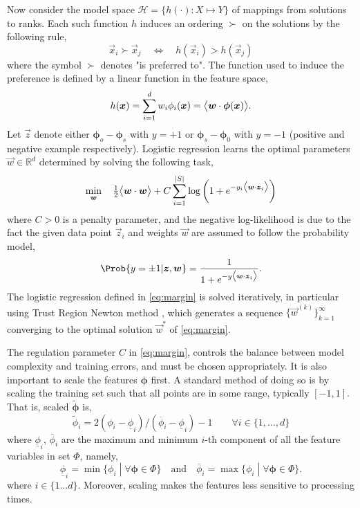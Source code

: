 \documentclass[smallextended]{svjour3}
\renewcommand{\vphi}{\bm \phi}
\begin{document}
	Now consider the model space $\mathcal{H} = \{h(\cdot) : X \mapsto Y\}$ of mappings from solutions to ranks. Each such function $h$ induces an ordering $\succ$ on the solutions  by the following rule,
	\begin{equation}\label{eq:linear}
	\vec{x}_i \succ \vec{x}_j \quad \Leftrightarrow \quad h(\vec{x}_i) > h(\vec{x}_j)
	\end{equation}
	where the symbol $\succ$ denotes "is preferred to".  The function used to induce the preference is defined by a linear function in the feature space,
	\begin{equation}\label{eq:jssp:linweights}
	h(\vec{x})=\sum_{i=1}^d w_i\phi_i(\vec{x})=\inner{\vec{w}}{\vphi(\vec{x})}.
	\end{equation}
	Let $\vec{z}$ denote either $\vphi_o-\vphi_s$ with $y=+1$ or $\vphi_s-\vphi_0$ with $y=-1$ (positive and negative example respectively). Logistic regression learns the optimal parameters $\vec{w}\in\mathbb{R}^d$ determined by solving the following task, 
	\begin{equation}\label{eq:margin}
	\min_{\vec{w}}\quad \tfrac{1}{2}\inner{\vec{w}}{\vec{w}} + C \sum_{i=1}^{\abs{S}} \log\left(1 + e^{-y_i \inner{\vec{w}}{\vec{z}_i}}\right) 
	\end{equation}
	where $C > 0$ is a penalty parameter, and the negative log-likelihood is due to the fact the given data point $\vec{z}_i$ and weights $\vec{w}$ are assumed to follow the probability model,
	\begin{equation}\label{eq:prob}
	\Prob{y=\pm1|\vec{z},\vec{w}}=\frac{1}{1+e^{-y\inner{\vec{w}}{\vec{z}_i}}}.
	\end{equation}
	The logistic regression defined in \eqref{eq:margin} is solved iteratively, in particular using Trust Region Newton method \cite{Lin08:newtontrustregion}, which generates a sequence $\{\vec{w}^{(k)}\}_{k=1}^\infty$ converging to the optimal solution $\vec{w}^*$ of \eqref{eq:margin}.
	
	The regulation parameter $C$ in \eqref{eq:margin}, controls the balance between model complexity and training errors, and must be chosen appropriately. It is also important to scale the features $\vphi$ first. A standard method of doing so is by scaling the training set such that all points are in some range, typically $[-1,1]$. That is, scaled $\tilde{\vphi}$ is,
	\begin{equation}\label{eq:scale}
	\tilde{\phi}_i = 2 (\phi_i - \underline{\phi}_i) / (\overline{\phi}_i - \underline{\phi}_i) - 1 
	\quad\quad \forall i\in\{1,\ldots,d\}
	\end{equation}
	where $\underline{\phi}_i$, $\overline{\phi}_i$ are the maximum and minimum $i$-th component of all the feature variables in set $\Phi$, namely,
	\begin{equation}
	\underline{\phi}_i=\min\{\phi_i\;|\;\forall\vphi\in \Phi\} \quad\textrm{and}\quad \overline{\phi}_i=\max\{\phi_i\;|\;\forall\vphi\in \Phi\}.
	\end{equation}
	where $i\in\{1\ldots d\}$. Moreover, scaling makes the features less sensitive to processing times.
	
\end{document}
